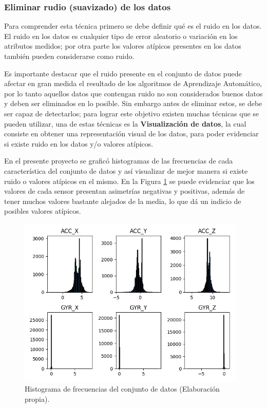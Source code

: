 \subsubsection{Eliminar rudio (suavizado) de los datos}

Para comprender esta t\'{e}cnica primero se debe definir qu\'{e} es el ruido en los datos. El ruido en los datos es cualquier tipo de error aleatorio o variaci\'{o}n en los atributos medidos; por otra parte los valores at\'{i}picos presentes en los datos tambi\'{e}n pueden considerarse como ruido. 

\vspace{5mm} %

Es importante destacar que el ruido presente en el conjunto de datos puede afectar en gran medida el resultado de los algoritmos de Aprendizaje Autom\'{a}tico, por lo tanto aquellos datos que contengan ruido no son considerados buenos datos y deben ser eliminados en lo posible. Sin embargo antes de eliminar estos, se debe ser capaz de detectarlos; para lograr este objetivo existen muchas t\'{e}cnicas que se pueden utilizar, una de estas t\'{e}cnicas es la \textbf{Visualizaci\'{o}n de datos}, la cual consiste en obtener una representaci\'{o}n visual de los datos, para poder evidenciar si existe ruido en los datos y/o valores at\'{i}picos.

\vspace{5mm} %

En el presente proyecto se grafic\'{o} histogramas de las frecuencias de cada caracter\'{i}stica del conjunto de datos y as\'{i} visualizar de mejor manera si existe ruido o valores at\'{i}picos en el mismo. En la Figura \ref{fig:hist} se puede evidenciar que los valores de cada sensor presentan asimetr\'{i}as negativas y positivas, adem\'{a}s de tener muchos valores bastante alejados de la media, lo que d\'{a} un indicio de posibles valores at\'{i}picos.

\begin{figure}[h!]
  \begin{center}	\includegraphics[width=0.97\textwidth,frame]{imagenes/Cap3/histograma_sensores}
  \caption{Histograma de frecuencias del conjunto de datos (Elaboraci\'{o}n propia).}
  \label{fig:hist}
  \end{center}
\end{figure}

